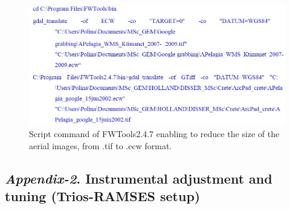 \documentclass[10pt, a4paper]{article}
\begin{document}
\begin{appendices}
\begin{figure}[H]
	\begin{center}
		\includegraphics[scale=0.4]{Script_Gdal.jpg}
		\caption{Script command of FWTools2.4.7 enabling to reduce the size of the aerial images, from .tif to .ecw format.}
	\end{center}
	\label{fig:A.2}
\end{figure}
\pagebreak

\subsection{\textit{Appendix-2}. Instrumental adjustment and tuning (Trios-RAMSES setup)}


\end{appendices}
\end{document}
